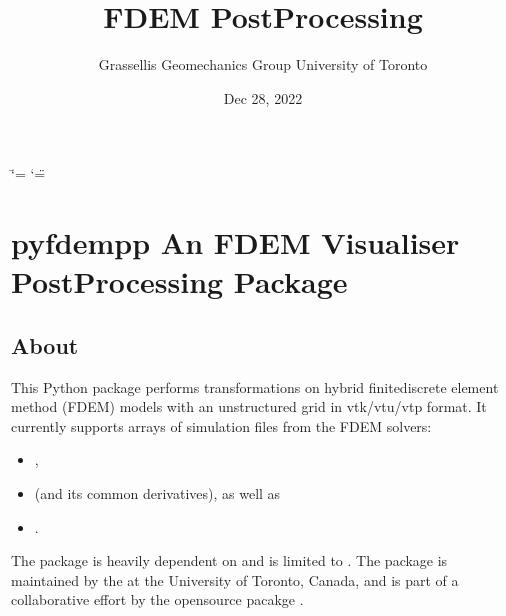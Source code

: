 \documentclass[letterpaper,10pt,english]{sphinxmanual}
\title{FDEM Post\sphinxhyphen{}Processing}
\date{Dec 28, 2022}
\author{Grasselli\textquotesingle{}s Geomechanics Group \sphinxhyphen{} University of Toronto}
\begin{document}
\ifdefined\shorthandoff
  \ifnum\catcode`\=\string=\active\shorthandoff{=}\fi
  \ifnum\catcode`\"=\active{}\fi
\fi

\pagestyle{empty}
\sphinxmaketitle
\pagestyle{plain}
\sphinxtableofcontents
\pagestyle{normal}
\label{\detokenize{index::doc}}


\sphinxstepscope


\chapter{pyfdempp \sphinxhyphen{} An FDEM Visualiser Post\sphinxhyphen{}Processing Package}
\label{\detokenize{postprocessing_intro:pyfdempp-an-fdem-visualiser-post-processing-package}}\label{\detokenize{postprocessing_intro::doc}}
\sphinxAtStartPar
{}


\section{About}
\label{\detokenize{postprocessing_intro:about}}
\sphinxAtStartPar
This Python package performs transformations on hybrid finite\sphinxhyphen{}discrete element method (FDEM) models with an unstructured grid in vtk/vtu/vtp format. It currently supports arrays of simulation files from the FDEM solvers:
\begin{itemize}
\item {} 
\sphinxAtStartPar
{},

\item {} 
\sphinxAtStartPar
{} (and its common derivatives), as well as

\item {} 
\sphinxAtStartPar
{}.

\end{itemize}

\sphinxAtStartPar
The package is heavily dependent on  and is limited to . The package is maintained by the  at the University of Toronto, Canada, and is part of a collaborative effort by the open\sphinxhyphen{}source pacakge .
\end{document}
